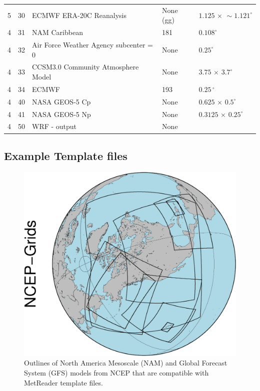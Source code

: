 \documentclass[11pt]{article}   %
\begin{document}
\begin{table}[h]
\begin{tabular}{| c | c | l | l | l |}
5 &  30 & ECMWF ERA-20C Reanalysis & None (gg) & $1.125 \, \times \, \sim 1.121^{\circ}$\\
4 &  31 & NAM Caribbean & 181 & $0.108^{\circ}$\\
  \hline
4 &  32 & Air Force Weather Agency subcenter = 0 & None & $0.25^{\circ}$ \\
4 &  33 & CCSM3.0 Community Atmosphere Model &None & $3.75 \, \times \,3.7^{\circ}$\\
4 &  34 & ECMWF & 193 & $0.25 \, ^{\circ}$ \\
  \hline
4 &  40 & NASA GEOS-5 Cp & None & $0.625 \, \times \,0.5^{\circ}$ \\
4 &  41 & NASA GEOS-5 Np & None & $0.3125 \, \times \,0.25^{\circ}$\\
4 &  50 & WRF - output & None & \\
\hline
\end{tabular}
\end{table}
\normalsize
\clearpage
\subsection{Example Template files}\label{ApTemplate}
\begin{figure}[htbp]\begin{center}
 \includegraphics[angle=-90,scale=0.7]{Figs/Overview_NCEP-Grids.pdf}
\parbox{15cm}{\caption{\label{FigNAMs}
Outlines of North America Mesoscale (NAM) and Global Forecast System (GFS)
models from NCEP that are compatible with MetReader template files.
}}
\end{center}\end{figure}
\end{document}
